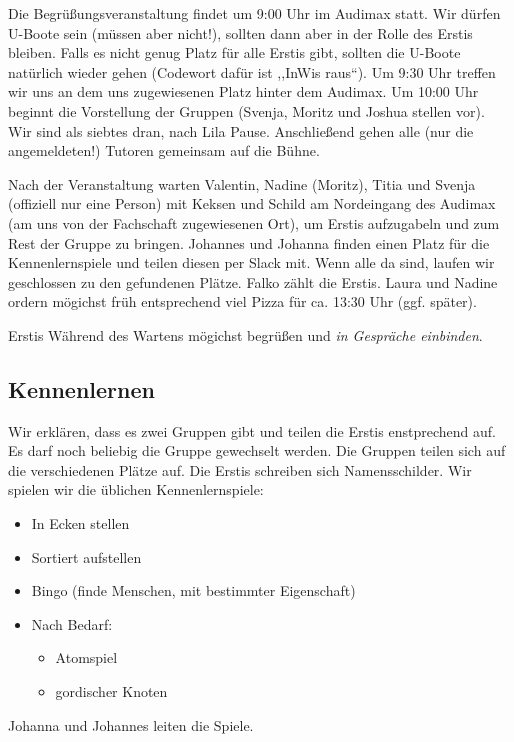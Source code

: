 \documentclass[10pt,twocolumn,ngerman]{scrartcl}
\begin{document}
Die Begrüßungsveranstaltung findet um 9:00 Uhr im Audimax statt. Wir
dürfen U-Boote sein (müssen aber nicht!), sollten dann aber in der
Rolle des Erstis bleiben. Falls es nicht genug Platz für alle Erstis
gibt, sollten die U-Boote natürlich wieder gehen (Codewort dafür ist
,,InWis raus``). Um 9:30 Uhr treffen wir uns an dem uns zugewiesenen
Platz hinter dem Audimax. Um 10:00 Uhr beginnt die Vorstellung der
Gruppen (Svenja, Moritz und Joshua stellen vor). Wir sind als siebtes
dran, nach Lila Pause. Anschließend gehen alle (nur die angemeldeten!)
Tutoren gemeinsam auf die Bühne.

Nach der Veranstaltung warten Valentin, Nadine (Moritz), Titia und
Svenja (offiziell nur eine Person) mit Keksen und Schild am Nordeingang
des Audimax (am uns von der Fachschaft zugewiesenen Ort), um Erstis
aufzugabeln und zum Rest der Gruppe zu bringen. Johannes und Johanna
finden einen Platz für die Kennenlernspiele und teilen diesen per
Slack mit. Wenn alle da sind, laufen wir geschlossen zu den gefundenen
Plätze. Falko zählt die Erstis. Laura und Nadine ordern mögichst
früh entsprechend viel Pizza für ca. 13:30 Uhr (ggf. später).

Erstis Während des Wartens mögichst begrüßen und \emph{in Gespräche
einbinden}.

\subsection{Kennenlernen}

Wir erklären, dass es zwei Gruppen gibt und teilen die Erstis enstprechend
auf. Es darf noch beliebig die Gruppe gewechselt werden. Die Gruppen
teilen sich auf die verschiedenen Plätze auf. Die Erstis schreiben
sich Namensschilder. Wir spielen wir die üblichen Kennenlernspiele: 
\begin{itemize}
\item In Ecken stellen
\item Sortiert aufstellen
\item Bingo (finde Menschen, mit bestimmter Eigenschaft)
\item Nach Bedarf:
\begin{itemize}
\item Atomspiel
\item gordischer Knoten
\end{itemize}
\end{itemize}
Johanna und Johannes leiten die Spiele.
\end{document}
